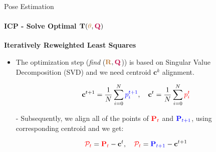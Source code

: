 \documentclass[aspectratio=169]{beamer}
\newcommand{\tikzRot}{0}
\newcommand{\tikzTrans}{(0,0)}
\newcommand{\tikzShowrobot}{0}
\newcommand{\tikzOneCenter}{0}
\begin{document}
\begin{frame}[fragile, c]{Pose Estimation}
	\framesubtitle{ICP - Solve Optimal $\mathbf{T}(\textcolor{brown}{\theta}, \textcolor{purple}{\mathbf{Q}})$}
	\textbf{Iteratively Reweighted Least Squares}

	\begin{minipage}[t]{0.5\textwidth}
		\begin{figure}
			\resizebox{0.7\textwidth}{!}{
				\renewcommand{\tikzRot}{30}
				\renewcommand{\tikzTrans}{(8,0)}
				\renewcommand{\tikzShowrobot}{0}
				\renewcommand{\tikzOneCenter}{0}
				\resizebox{0.8\textwidth}{!}{
				}
			}
		\end{figure}
	\end{minipage}
	\begin{minipage}[t]{0.5\textwidth}

	\vspace{-0.2in}
	\begin{itemize}
		\item The optimization step (\textit{find} ($\textcolor{brown}{\mathbf{R}}, \textcolor{purple}{\mathbf{Q}}$)) is based on Singular Value Decomposition (SVD) and we need centroid $\mathbf{c}^k$ alignment.

	\vspace{-0.2in}
	\begin{equation*}
		\mathbf{c}^{t+1} = \frac{1}{N}\sum\limits_{i=0}^N \textcolor{blue}{p^{t+1}_i}, 
		\quad
		\mathbf{c}^{t} = \frac{1}{N}\sum\limits_{i=0}^N \textcolor{red}{p^{t}_i}
	\end{equation*}

	\item[-] Subsequently, we align all of the points of $\textcolor{red}{\mathbf{P}_{t}}$ and $\textcolor{blue}{\mathbf{P}_{t+1}}$, using corresponding centroid and we get:

	\vspace{-0.2in}
	\begin{equation*}
		\textcolor{red}{\mathcal{P}_{t}} = \textcolor{red}{\mathbf{P}_{t}} - \mathbf{c}^{t}, \quad \textcolor{red}{\mathcal{P}_{t}} = \textcolor{blue}{\mathbf{P}_{t+1}} - \mathbf{c}^{t+1}
	\end{equation*}

	\end{itemize}
	\end{minipage}
\end{frame}
\end{document}
